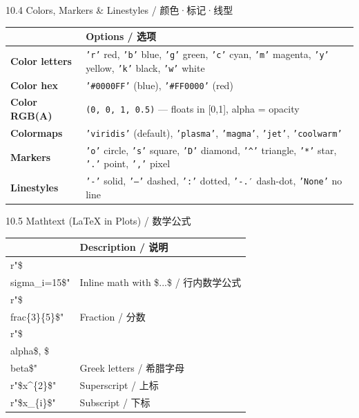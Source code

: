\documentclass[11pt,a4paper]{report}
\let\oldtexttt\texttt
\renewcommand{\texttt}[1]{\textcolor{mainblue}{\oldtexttt{#1}}}
\begin{document}
\begin{cmdsection}{10.4  Colors, Markers \& Linestyles / 颜色·标记·线型}
\normalsize\renewcommand{\arraystretch}{1.4}
\centering
\begin{tabularx}{\textwidth}{@{}>{\ttfamily}l>{\raggedright\arraybackslash}X@{}}
\toprule
\multicolumn{1}{@{}l}{\textbf{Specification}} & \textbf{Options / 选项} \\ \midrule
\textbf{Color letters}  & \texttt{'r'} red, \texttt{'b'} blue, \texttt{'g'} green, \texttt{'c'} cyan, \texttt{'m'} magenta, \texttt{'y'} yellow, \texttt{'k'} black, \texttt{'w'} white \\
\textbf{Color hex}      & \texttt{'\#0000FF'} (blue), \texttt{'\#FF0000'} (red) \\
\textbf{Color RGB(A)}   & \texttt{(0, 0, 1, 0.5)} — floats in [0,1], alpha = opacity \\
\textbf{Colormaps}      & \texttt{'viridis'} (default), \texttt{'plasma'}, \texttt{'magma'}, \texttt{'jet'}, \texttt{'coolwarm'} \\
\textbf{Markers}        & \texttt{'o'} circle, \texttt{'s'} square, \texttt{'D'} diamond, \texttt{'\^{}'} triangle, \texttt{'*'} star, \texttt{'.'} point, \texttt{','} pixel \\
\textbf{Linestyles}     & \texttt{'-'} solid, \texttt{'--'} dashed, \texttt{':'} dotted, \texttt{'-.′} dash-dot, \texttt{'None'} no line \\
\bottomrule
\end{tabularx}
\end{cmdsection}

\begin{cmdsection}{10.5  Mathtext (LaTeX in Plots) / 数学公式}
\normalsize\renewcommand{\arraystretch}{1.4}
\centering
\begin{tabularx}{\textwidth}{@{}>{\ttfamily}l>{\raggedright\arraybackslash}X@{}}
\toprule
\multicolumn{1}{@{}l}{\textbf{Syntax}} & \textbf{Description / 说明} \\ \midrule
r"\$\\sigma\_i=15\$"            & Inline math with \$...\$ / 行内数学公式 \\
r"\$\\frac\{3\}\{5\}\$"         & Fraction / 分数 \\
r"\$\\alpha\$, \$\\beta\$"      & Greek letters / 希腊字母 \\
r"\$x\^{}\{2\}\$"               & Superscript / 上标 \\
r"\$x\_\{i\}\$"                 & Subscript / 下标 \\
\bottomrule
\end{tabularx}
\end{cmdsection}
\end{document}
